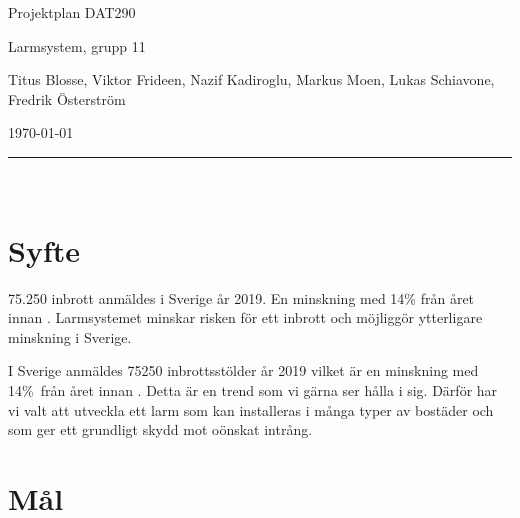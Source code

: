 \documentclass[a4paper]{article}
\newcommand\namn{Larmsystem}
\begin{document}
%
%

\thispagestyle{empty}

\begin{center}
    \parskip=14pt%
    \vspace*{3\parskip}%

    {\LARGE Projektplan DAT290}

    {\large \namn, grupp 11

    Titus Blosse, Viktor Frideen, Nazif Kadiroglu, Markus Moen, Lukas Schiavone, Fredrik Österström

    \today}

    \rule{7cm}{0.4pt}\\
\end{center}
\newpage

%
%

\thispagestyle{empty}

\tableofcontents
\newpage

%
%


\section{Syfte}

75.250 inbrott anmäldes i Sverige år 2019. En minskning med 14\% från året innan \cite{brastold}. Larmsystemet minskar risken för ett inbrott och möjliggör ytterligare minskning i Sverige. %

I Sverige anmäldes 75250 inbrottsstölder år 2019 vilket är en minskning med 14\%\ från året innan \cite{brastold}. Detta är en trend som vi gärna ser hålla i sig. Därför har vi valt att utveckla ett larm som kan installeras i många typer av bostäder och som ger ett grundligt skydd mot oönskat intrång.


\section{Mål}
\end{document}
